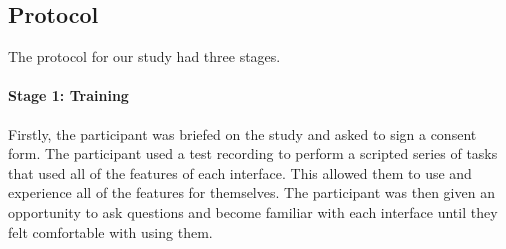 




\subsection{Protocol}

The protocol for our study had three stages.

\paragraph{Stage 1: Training}

Firstly, the participant was briefed on the study and asked to sign a consent form.  The participant used a test
recording to perform a scripted series of tasks that used all of the features of each interface.  This allowed them to
use and experience all of the features for themselves. The participant was then given an opportunity to ask questions
and become familiar with each interface until they felt comfortable with using them.

